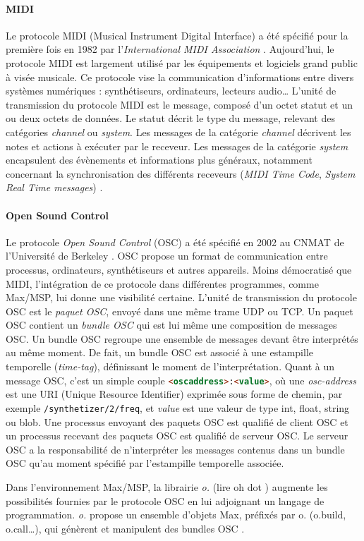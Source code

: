 \paragraph{MIDI} Le protocole MIDI (Musical Instrument Digital Interface) a été spécifié pour la première fois en 1982 par l'\textit{International MIDI Association} \cite{international1983}. Aujourd'hui, le protocole MIDI est  largement utilisé par les équipements et logiciels grand public à visée musicale. Ce protocole vise la communication d'informations entre divers systèmes numériques : synthétiseurs, ordinateurs, lecteurs audio… L'unité de transmission du protocole MIDI est le message, composé d'un octet statut et un ou deux octets de données. Le statut décrit le type du message, relevant des catégories \textit{channel} ou \textit{system}. Les messages de la catégorie \textit{channel} décrivent les notes et actions à exécuter par le receveur. Les messages de la catégorie \textit{system} encapsulent des évènements et informations plus généraux, notamment concernant la synchronisation des différents receveurs (\textit{MIDI Time Code}, \textit{System Real Time messages}) \cite{midi1996}.
 
\paragraph{Open Sound Control} Le protocole \textit{Open Sound Control} (OSC) a été spécifié en 2002 au CNMAT de l'Université de Berkeley \cite{wright2002}. OSC propose un format de communication entre processus, ordinateurs, synthétiseurs et autres appareils. Moins démocratisé que MIDI, l'intégration de ce protocole dans différentes programmes, comme Max/MSP, lui donne une visibilité certaine.
L'unité de transmission du protocole OSC est le \textit{paquet OSC}, envoyé dans une même trame UDP ou TCP.
Un paquet OSC contient un \textit{bundle OSC} qui est lui même une composition de messages OSC.
Un bundle OSC regroupe une ensemble de messages devant être interprétés au même moment. De fait, un bundle OSC est associé à une estampille temporelle (\textit{time-tag}), définissant le moment de l'interprétation.
Quant à un message OSC, c'est un simple couple \lstinline[language=html]|<oscaddress>:<value>|, où une \textit{osc-address} est une URI (Unique Resource Identifier) exprimée sous forme de chemin, par exemple \texttt{/synthetizer/2/freq}, et \textit{value} est une valeur de type int, float, string ou blob. 
Une processus envoyant des paquets OSC est qualifié de client OSC et un processus recevant des paquets OSC est qualifié de serveur OSC. Le serveur OSC a la responsabilité de n'interpréter les messages contenus dans un bundle OSC qu'au moment spécifié par l'estampille temporelle associée.

Dans l'environnement Max/MSP, la librairie \textit{o.} (lire \og oh dot \fg) augmente les possibilités fournies par le protocole OSC en lui adjoignant un langage de programmation. \textit{o.} propose un ensemble d'objets Max, préfixés par \og o. \fg (o.build, o.call…), qui génèrent et manipulent des bundles OSC \cite{maccallum2011}.